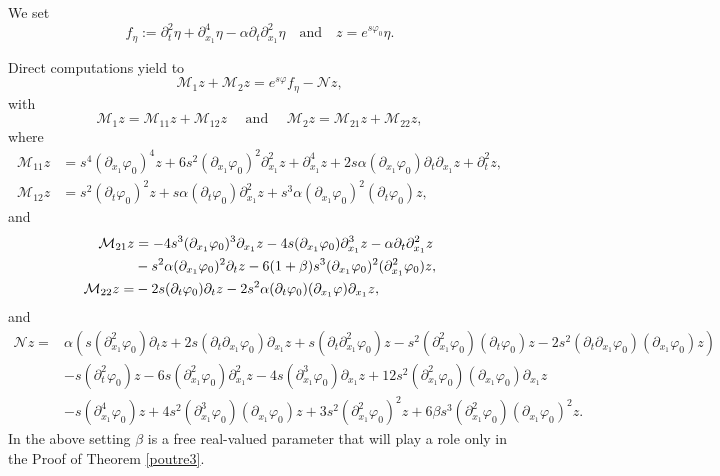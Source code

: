 \documentclass[a4paper, 12pt]{article}
\theoremstyle{plain}
\theoremstyle{definition}
\numberwithin{theorem}{section}
\numberwithin{equation}{section}
\begin{document}
{We set 
$$f_\eta:=\partial^2_t\eta+\partial^4_{x_1}\eta-\alpha\partial_t\partial^2_{x_1}\eta\quad \text{and}\quad z=e^{s\varphi_0}\eta.$$



\noindent Direct computations yield to
\begin{equation}\label{decomp}
    \mathcal{M}_1z+\mathcal{M}_2z=e^{s\varphi}f_\eta-\mathcal{N}z,
\end{equation}
with
\begin{equation}\label{DefM1M2}
\mathcal{M}_1 z=\mathcal{M}_{11}z+\mathcal{M}_{12}z\quad \mbox{ and }\quad \mathcal{M}_2 z=\mathcal{M}_{21}z+\mathcal{M}_{22}z,
\end{equation}where
\begin{align}\label{DefM11}
\mathcal{M}_{11}z&=s^4(\partial_{x_1}\varphi_0)^4z+6s^2(\partial_{x_1}\varphi_0)^2\partial^2_{x_1}z+\partial^4_{x_1}z+2s\alpha(\partial_{x_1}\varphi_0)\partial_t\partial_{x_1}z+\partial^2_tz,\\
\mathcal{M}_{12}z&=s^2(\partial_t\varphi_0)^2z+s\alpha(\partial_t\varphi_0)\partial^2_{x_1}z+s^3\alpha(\partial_{x_1}\varphi_0)^2(\partial_t\varphi_0)z,\label{DefM12}
\end{align}
and
\begin{align}\notag
\mathcal{M}_{21}z&=-4s^3(\partial_{x_1}\varphi_0)^3\partial_{x_1}z-4s(\partial_{x_1}\varphi_0)\partial^3_{x_1}z-\alpha\partial_t\partial^2_{x_1}z\\
&-s^2\alpha(\partial_{x_1}\varphi_0)^2\partial_tz-6(1+\beta)s^3(\partial_{x_1}\varphi_0)^2(\partial^2_{x_1}\varphi_0)z, \label{DefM21}\\ 
\mathcal{M}_{22}z=&-2s(\partial_t\varphi_0)\partial_tz-2s^2\alpha(\partial_t\varphi_0)(\partial_{x_1}\varphi)\partial_{x_1}z,\label{DefM22}
\end{align}
and
\begin{align*}
\mathcal{N}z=&\alpha(s(\partial^2_{x_1}\varphi_0)\partial_tz+2s(\partial_t\partial_{x_1}\varphi_0)\partial_{x_1}z+s(\partial_t\partial^2_{x_1}\varphi_0)z-s^2(\partial^2_{x_1}\varphi_0)(\partial_t\varphi_0)z-2s^2(\partial_t\partial_{x_1}\varphi_0)(\partial_{x_1}\varphi_0)z)\\
&-s(\partial^2_t\varphi_0)z-6s(\partial^2_{x_1}\varphi_0)\partial^2_{x_1}z-4s(\partial^3_{x_1}\varphi_0)\partial_{x_1}z+12s^2(\partial^2_{x_1}\varphi_0)(\partial_{x_1}\varphi_0)\partial_{x_1}z\\
&-s(\partial^4_{x_1}\varphi_0)z+4s^2(\partial^3_{x_1}\varphi_0)(\partial_{x_1}\varphi_0)z+3s^2(\partial^2_{x_1}\varphi_0)^2z+6\beta s^3(\partial^2_{x_1}\varphi_0)(\partial_{x_1}\varphi_0)^2z.
\end{align*}
In the above setting $\beta$ is a free real-valued parameter that will play a role only in the Proof of Theorem \ref{poutre3}. 

}
\end{document}

